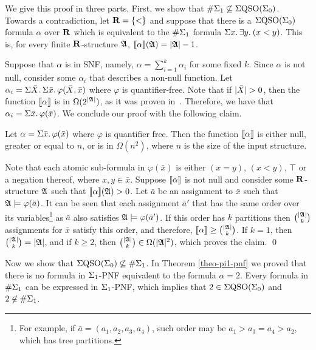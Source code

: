 We give this proof in three parts.
First, we show that $\#\Sigma_{1} \not\subseteq \Sigma{\rm QSO}(\Sigma_{0})$. 
Towards a contradiction, let $\mathbf{R} = \{ < \}$ and suppose that there is a $\Sigma{\rm QSO}(\Sigma_{0})$ formula $\alpha$ over $\mathbf{R}$ which is equivalent to the $\#\Sigma_{1}$ formula $\Sigma{x}.\, \exists{y}.\: (x < y)$. 
This is, for every finite $\mathbf{R}$-structure $\mathfrak{A}$, ${\llbracket{}{\alpha}\rrbracket}(\mathfrak{A}) = \vert \mathfrak{A} \vert - 1$.

Suppose that $\alpha$ is in SNF, namely, $\alpha = \sum_{i = 1}^k \alpha_i$ for some fixed $k$. 
Since $\alpha$ is not null, consider some $\alpha_i$ that describes a non-null function. 
Let $\alpha_i = \Sigma{\bar{X}}.\,\Sigma{\bar{x}}.\,\varphi(\bar{X},\bar{x})$ where $\varphi$ is quantifier-free. 
Note that if $\vert \bar{X} \vert > 0$, then the function ${\llbracket{}{\alpha}\rrbracket}$ is in $\Omega(2^{\vert \mathfrak{A} \vert})$, as it was proven in~\cite{SalujaST95}. 
Therefore, we have that $\alpha_i = \Sigma{\bar{x}}.\,\varphi(\bar{x})$. 
We conclude our proof with the following claim.
\begin{clm}
	Let $\alpha = \Sigma{\bar{x}}.\,\varphi(\bar{x})$	where $\varphi$ is quantifier free. 
	Then the function ${\llbracket{}{\alpha}\rrbracket}$ is either null, greater or equal to $n$, or is in $\Omega(n^2)$, where $n$ is the size of the input structure.
\end{clm}
\proof
	Note that each atomic sub-formula in $\varphi(\bar{x})$ is either $(x = y)$, $(x < y)$, $\top$ or a negation thereof, where $x,y\in\bar{x}$. 
	Suppose ${\llbracket{}{\alpha}\rrbracket}$ is not null and consider some $\mathbf{R}$-structure $\mathfrak{A}$ such that ${\llbracket{}{\alpha}\rrbracket}(\mathfrak{A}) > 0$. 
	Let $\bar{a}$ be an assignment to $\bar{x}$ such that $\mathfrak{A}\models\varphi(\bar{a})$. 
	It can be seen that each assignment $\bar{a}'$ that has the same order over its variables\footnote{For example, if $\bar{a} = (a_1,a_2,a_3,a_4)$, such order may be $a_1 > a_3 = a_4 > a_2$, which has tree partitions.}	as $\bar{a}$ also satisfies $\mathfrak{A}\models\varphi(\bar{a}')$. 
	If this order has $k$ partitions then $\binom{\vert \mathfrak{A} \vert}{k}$ assignments for $\bar{x}$ satisfy this order, and therefore, ${\llbracket{}{\alpha}\rrbracket} \geq \binom{\vert \mathfrak{A} \vert}{k}$. 
	If $k = 1$, then $\binom{\vert \mathfrak{A} \vert}{k} = \vert \mathfrak{A} \vert$, and if $k \geq 2$, then $\binom{\vert \mathfrak{A} \vert}{k} \in \Omega(\vert \mathfrak{A} \vert^2)$, which proves the claim.
\qed

Now we show that $\Sigma{\rm QSO}(\Sigma_{0}) \not\subseteq \#\Sigma_{1}$. 
In Theorem \ref{theo-pi1-pnf} we proved that there is no formula in $\Sigma_{1}$-PNF equivalent to the formula $\alpha = 2$. 
Every formula in $\#\Sigma_{1}$ can be expressed in $\Sigma_{1}$-PNF, which implies that $2 \in \Sigma{\rm QSO}(\Sigma_{0})$ and $2 \not\in \#\Sigma_{1}$.

